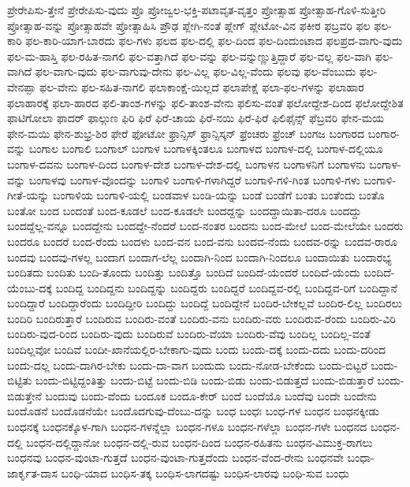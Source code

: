 {ಪ್ರೇರೇಪಿಸು-ತ್ತೇನೆ
ಪ್ರೇರೇಪಿಸು-ವುದು
ಪ್ರೊ
ಪ್ರೋಜ್ವಲ-ಭಕ್ತಿ-ಪಟಾವೃತ-ವೃತ್ತಂ
ಪ್ರೋತ್ಸಾಹ
ಪ್ರೋತ್ಸಾಹ-ಗೊಳಿ-ಸುತ್ತೀರಿ
ಪ್ರೋತ್ಸಾಹ-ವನ್ನು
ಪ್ರೋತ್ಸಾಹವೇ
ಪ್ರೋತ್ಸಾಹಿಸಿ
ಪ್ರೌಢ
ಪ್ಲೇಗಿ-ನಂತೆ
ಪ್ಲೇಗ್
ಪ್ಲೇಟೋ-ವಿನ
ಫಕೀರ
ಫಬ್ರವರಿ
ಫಲ
ಫಲ-ಕಾರಿ
ಫಲ-ಕಾರಿ-ಯಾಗ-ಬಾರದು
ಫಲ-ಗಳು
ಫಲದ
ಫಲ-ದಲ್ಲಿ
ಫಲ-ದಿಂದ
ಫಲ-ದಿಂದುಂಟಾದ
ಫಲಪ್ರದ-ವಾಗು-ವುದು
ಫಲ-ಮ-ಹಾಸ್ತಿ
ಫಲ-ರಹಿತ-ನಾಗಲಿ
ಫಲ-ವತ್ತಾಗಿದೆ
ಫಲ-ವನ್ನು
ಫಲ-ವನ್ನುಣ್ಣುತ್ತಿದ್ದಾರೆ
ಫಲ-ವಲ್ಲ
ಫಲ-ವಾಗಿ
ಫಲ-ವಾಗಿದೆ
ಫಲ-ವಾಗು-ವುದು
ಫಲ-ವಾಗುವು-ದೇನು
ಫಲ-ವಿಲ್ಲ
ಫಲ-ವಿಲ್ಲ-ವೆಂದು
ಫಲವು
ಫಲ-ವೆಂಬುದು
ಫಲ-ವೇನಪ್ಪಾ
ಫಲ-ವೇನು
ಫಲ-ಸಹಿತ-ನಾಗಲಿ
ಫಲಾಕಾಂಕ್ಷೆ-ಯಿಲ್ಲದೆ
ಫಲಾಪೇಕ್ಷೆ
ಫಲಾ-ಫಲ-ಗಳನ್ನು
ಫಲಾಹಾರ
ಫಲಾಹಾರಕ್ಕೆ
ಫಲಾ-ಹಾರದ
ಫಲಿ-ತಾಂಶ-ಗಳನ್ನು
ಫಲಿ-ತಾಂಶ-ವೇನು
ಫಲಿಸು-ವಂತೆ
ಫಲೋದ್ದೇಶ-ದಿಂದ
ಫಲೋದ್ದೇಶಿತ
ಫಾಟಿಗೋಲಾ
ಫಾದರ್
ಫಾಲ್ಗುಣ
ಫಿರಿ
ಫಿರೆ
ಫಿರೆ-ಚಾಯ
ಫಿರೆ-ನಯಿ
ಫಿರೆ-ಫಿರೆ
ಫಿಲಿಫೈನ್ಸ್
ಫೆಬ್ರವರಿ
ಫೇನ-ಮಯ
ಫೇನ-ಮಯಿ
ಫೇನ-ಶುಭ್ರ-ಶಿರ
ಫೇರೆ
ಫೋಟೋ
ಫ್ರಾನ್ಸಿಸ್
ಫ್ರಾನ್ಸಿಸ್ಕನ್
ಫ್ರೆಂಚರು
ಫ್ರೆಂಚ್
ಬಂಗಜ
ಬಂಗಾರದ
ಬಂಗಾರ-ವನ್ನು
ಬಂಗಾಲ
ಬಂಗಾಲಿ
ಬಂಗಾಲ್
ಬಂಗಾಳ
ಬಂಗಾಳಕ್ಕಿಂತಲೂ
ಬಂಗಾಳದ
ಬಂಗಾಳ-ದಲ್ಲಿ
ಬಂಗಾಳ-ದಲ್ಲಿಯೂ
ಬಂಗಾಳ-ದವನು
ಬಂಗಾಳ-ದಿಂದ
ಬಂಗಾಳ-ದೇಶ
ಬಂಗಾಳ-ದೇಶ-ದಲ್ಲಿ
ಬಂಗಾಳನ
ಬಂಗಾಳನಿಗೆ
ಬಂಗಾಳನು
ಬಂಗಾಳ-ವನ್ನು
ಬಂಗಾಳವು
ಬಂಗಾಳ-ವೊಂದನ್ನು
ಬಂಗಾಳಿ
ಬಂಗಾಳಿ-ಗಳಾಗಿದ್ದರೆ
ಬಂಗಾಳಿ-ಗಳಿ-ಗಿಂತ
ಬಂಗಾಳಿ-ಗಳು
ಬಂಗಾಳಿ-ಗೀತೆ-ಯನ್ನು
ಬಂಗಾಳಿಯ
ಬಂಗಾಳಿ-ಯಲ್ಲಿ
ಬಂಡವಾಳ
ಬಂಡಿ-ಯನ್ನು
ಬಂಡೆ
ಬಂಡೆಗೆ
ಬಂತು
ಬಂತೆಂದು
ಬಂತೊ
ಬಂತೋ
ಬಂದ
ಬಂದಂತೆ
ಬಂದ-ಕೂಡಲೆ
ಬಂದ-ಕೂಡಲೇ
ಬಂದದ್ದನ್ನು
ಬಂದದ್ದಾಯಿತಾ-ದರೂ
ಬಂದದ್ದು
ಬಂದದ್ದೆಲ್ಲ-ವನ್ನೂ
ಬಂದದ್ದೇನು
ಬಂದದ್ದೇ-ನೆಂದರೆ
ಬಂದ-ನಂತರ
ಬಂದನು
ಬಂದ-ಮೇಲೆ
ಬಂದ-ಮೇಲೆಯೇ
ಬಂದರು
ಬಂದರೂ
ಬಂದರೆ
ಬಂದ-ರೆಂದು
ಬಂದಳು
ಬಂದ-ವನ
ಬಂದ-ವನು
ಬಂದವ-ನೆಂದು
ಬಂದವ-ರನ್ನು
ಬಂದವ-ರಾರೂ
ಬಂದವು
ಬಂದವು-ಗಳಲ್ಲ
ಬಂದಾಗ
ಬಂದಾಗ-ಲೆಲ್ಲ
ಬಂದಾಗಿ-ನಿಂದ
ಬಂದಾಗಿ-ನಿಂದಲೂ
ಬಂದಾಯಿತು
ಬಂದಾರಭ್ಯ
ಬಂದಿತದು
ಬಂದಿತು
ಬಂದಿ-ತೊಂದು
ಬಂದಿತ್ತು
ಬಂದಿತ್ತೊ
ಬಂದಿದೆ
ಬಂದಿದೆ-ಯೆಂದರೆ
ಬಂದಿದೆ-ಯೆಂದು
ಬಂದಿದೆ-ಯೆಂಬು-ದಕ್ಕೆ
ಬಂದಿದ್ದ
ಬಂದಿದ್ದನು
ಬಂದಿದ್ದನ್ನು
ಬಂದಿದ್ದರು
ಬಂದಿದ್ದರೆ
ಬಂದಿದ್ದವ-ರಲ್ಲಿ
ಬಂದಿದ್ದವ-ರಿಗೆ
ಬಂದಿದ್ದಾನೆ
ಬಂದಿದ್ದಾರೆ
ಬಂದಿದ್ದಾರೆಂದು
ಬಂದಿದ್ದೀರಿ
ಬಂದಿದ್ದು
ಬಂದಿದ್ದೆ
ಬಂದಿದ್ದೇನೆ
ಬಂದಿರ-ಬೇಕಲ್ಲವೆ
ಬಂದಿರ-ಲಿಲ್ಲ
ಬಂದಿರಲು
ಬಂದಿರಿ
ಬಂದಿರುತ್ತಾರೆ
ಬಂದಿರುವ
ಬಂದಿರು-ವಂತೆ
ಬಂದಿರು-ವನು
ಬಂದಿರು-ವರು
ಬಂದಿರುವ-ರೆಂದು
ಬಂದಿರು-ವಿರಿ
ಬಂದಿರು-ವುದ-ರಿಂದ
ಬಂದಿರು-ವುದು
ಬಂದಿರುವೆ
ಬಂದಿರು-ವೆಯಾ
ಬಂದಿರು-ವೆವು
ಬಂದಿಲ್ಲ
ಬಂದಿಲ್ಲ-ವಂತೆ
ಬಂದಿಲ್ಲವೋ
ಬಂದಿವೆ
ಬಂದೀ-ಖಾನೆಯಲ್ಲಿರ-ಬೇಕಾಗು-ವುದು
ಬಂದು
ಬಂದು-ದಕ್ಕೆ
ಬಂದು-ದದು
ಬಂದು-ದರಿಂದ
ಬಂದು-ದಲ್ಲ
ಬಂದು-ದಾಗಿರ-ಬೇಕು
ಬಂದು-ದಾ-ವಾಗ
ಬಂದುದು
ಬಂದು-ನೋಡ-ಬೇಕೆಂದು
ಬಂದು-ಬಿಟ್ಟರೆ
ಬಂದು-ಬಿಟ್ಟಿತು
ಬಂದು-ಬಿಟ್ಟಿದ್ದಂತಿತ್ತು
ಬಂದು-ಬಿಟ್ಟೆ
ಬಂದು-ಬಿಡಿ
ಬಂದು-ಬಿಡು
ಬಂದು-ಬಿಡುತ್ತದೆ
ಬಂದು-ಬಿಡುತ್ತಾರೆ
ಬಂದು-ಬಿಡುತ್ತೇನೆ
ಬಂದುವು
ಬಂದು-ವೆಂದು
ಬಂದೂಕ
ಬಂದೂ-ಕೇರ್
ಬಂದೆ
ಬಂದೆಯೊ
ಬಂದೆವು
ಬಂದೇ
ಬಂದೇನು
ಬಂದೊಡನೆ
ಬಂದೊಡನೆಯೇ
ಬಂದೊದಗುವು-ದೆಂಬು-ದನ್ನು
ಬಂಧ
ಬಂಧಃ
ಬಂಧ-ಗಳ
ಬಂಧನ
ಬಂಧನಕ್ಕೀಡು
ಬಂಧನಕ್ಕೆ
ಬಂಧನಕ್ಕೊಳ-ಗಾಗಿ
ಬಂಧನ-ಗಳನ್ನೆಲ್ಲಾ
ಬಂಧನ-ಗಳೂ
ಬಂಧನ-ಗಳೆಲ್ಲಾ
ಬಂಧನ-ಗಳೇ
ಬಂಧನದ
ಬಂಧನ-ದಲ್ಲಿ
ಬಂಧನ-ದಲ್ಲಿದ್ದಾನೋ
ಬಂಧನ-ದಲ್ಲಿ-ರುವ
ಬಂಧನ-ದಿಂದ
ಬಂಧನ-ರಹಿತನು
ಬಂಧನ-ವಿಮುಕ್ತ-ರಾಗಲು
ಬಂಧನವು
ಬಂಧನ-ವುಂಟಾ-ಗುತ್ತದೆ
ಬಂಧನ-ವುಂಟಾ-ಗುತ್ತದೆಂದು
ಬಂಧನ-ವೆಂದ-ರೇನು
ಬಂಧನವೇ
ಬಂಧಾ-ಜಾರ್ಕೃತ-ದಾಸ
ಬಂಧಿ-ಯಾದ
ಬಂಧಿಸ-ತಕ್ಕ
ಬಂಧಿಸ-ಲಾಗದಷ್ಟು
ಬಂಧಿಸ-ಲಾರವು
ಬಂಧಿ-ಸುವ
ಬಂಧು
}
